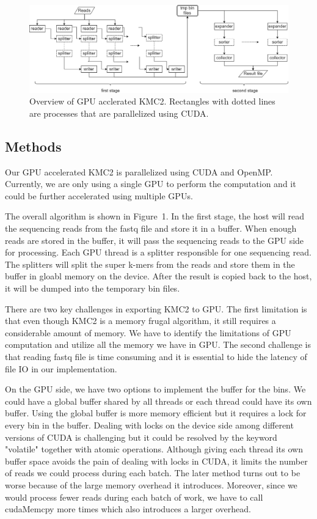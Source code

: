 \documentclass{bioinfo}
\begin{document}
\begin{figure}[t]
	\centering
	\includegraphics[scale=0.5]{kmc2.png}
	\caption{Overview of GPU acclerated KMC2. Rectangles with dotted lines are processes
	that are parallelized using CUDA.}\label{fig:01}
\end{figure}
\newpage
\begin{methods}
\section{Methods}
\enlargethispage{6pt}
Our GPU accelerated KMC2 is parallelized using CUDA and OpenMP. Currently, we are only
using a single GPU to perform the computation and it could be further accelerated using
multiple GPUs.

The overall algorithm is shown in Figure~1\vphantom{\ref{fig:01}}.
In the first stage, the host will read the sequencing reads from the fastq file and store
it in a buffer.
When enough reads are stored in the buffer, it will pass the sequencing reads to the GPU
side for processing.
Each GPU thread is a splitter responsible for one sequencing read. The splitters will
split the super k-mers from the reads and store them in the buffer in gloabl memory on
the device.
After the result is copied back to the host, it will be dumped into the temporary bin
files.

There are two key challenges in exporting KMC2 to GPU.
The first limitation is that even though KMC2 is a memory frugal algorithm, it still
requires a considerable amount of memory.
We have to identify the limitations of GPU computation and utilize all the memory we have
in GPU.
The second challenge is that reading fastq file is time consuming and it is essential to
hide the latency of file IO in our implementation.

On the GPU side, we have two options to implement the buffer for the bins. We could
have a global buffer shared by all threads or each thread could have its own buffer.
Using the global buffer is more memory efficient but it requires a lock for every bin in
the buffer.
Dealing with locks on the device side among different versions of CUDA is challenging but
it could be resolved by the keyword "volatile" together with atomic operations.
Although giving each thread its own buffer space avoids the pain of dealing with locks in
CUDA, it limits the number of reads we could process during each batch.
The later method turns out to be worse because of the large memory overhead it introduces.
Moreover, since we would process fewer reads during each batch of work, we have to call
cudaMemcpy more times which also introduces a larger overhead.


\end{methods}
\end{document}
